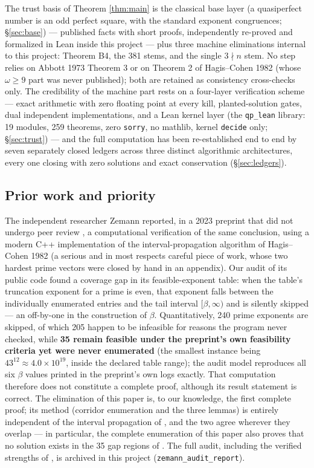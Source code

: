 \documentclass[11pt]{article}
\theoremstyle{remark}
\begin{document}
The trust basis of Theorem \ref{thm:main} is the classical base layer (a quasiperfect number is an odd perfect square, with the standard exponent congruences; \S\ref{sec:base}) --- published facts with short proofs, independently re-proved and formalized in Lean inside this project --- plus three machine eliminations internal to this project: Theorem B4, the 381 stems, and the single $3 \nmid n$ stem. No step relies on Abbott 1973 Theorem 3 or on Theorem 2 of Hagis--Cohen 1982 (whose $\omega \ge 9$ part was never published); both are retained as consistency cross-checks only. The credibility of the machine part rests on a four-layer verification scheme --- exact arithmetic with zero floating point at every kill, planted-solution gates, dual independent implementations, and a Lean kernel layer (the \texttt{qp\_lean} library: 19 modules, 259 theorems, zero \texttt{sorry}, no mathlib, kernel \texttt{decide} only; \S\ref{sec:trust}) --- and the full computation has been re-established end to end by seven separately closed ledgers across three distinct algorithmic architectures, every one closing with zero solutions and exact conservation (\S\ref{sec:ledgers}).

\subsection{Prior work and priority}

The independent researcher Zemann reported, in a 2023 preprint that did not undergo peer review \cite{zemann}, a computational verification of the same conclusion, using a modern C++ implementation of the interval-propagation algorithm of Hagis--Cohen 1982 (a serious and in most respects careful piece of work, whose two hardest prime vectors were closed by hand in an appendix). Our audit of its public code found a coverage gap in its feasible-exponent table: when the table's truncation exponent for a prime is even, that exponent falls between the individually enumerated entries and the tail interval $[\beta, \infty)$ and is silently skipped --- an off-by-one in the construction of $\beta$. Quantitatively, 240 prime exponents are skipped, of which 205 happen to be infeasible for reasons the program never checked, while \textbf{35 remain feasible under the preprint's own feasibility criteria yet were never enumerated} (the smallest instance being $43^{12} \approx 4.0 \times 10^{19}$, inside the declared table range); the audit model reproduces all six $\beta$ values printed in the preprint's own logs exactly. That computation therefore does not constitute a complete proof, although its result statement is correct. The elimination of this paper is, to our knowledge, the first complete proof; its method (corridor enumeration and the three lemmas) is entirely independent of the interval propagation of \cite{zemann}, and the two agree wherever they overlap --- in particular, the complete enumeration of this paper also proves that no solution exists in the 35 gap regions of \cite{zemann}. The full audit, including the verified strengths of \cite{zemann}, is archived in this project (\texttt{zemann\_audit\_report}).
\end{document}

